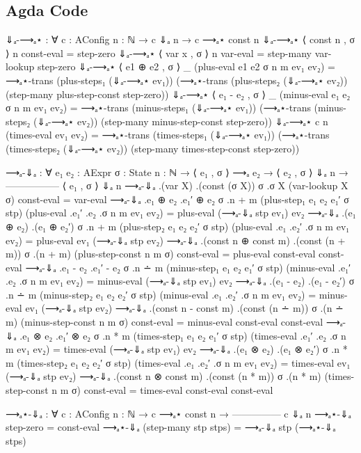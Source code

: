 \documentclass{lecturenotes}
\begin{document}
\subsection{Agda Code}

\begin{code}
⇓ₐ-⟶ₐ⋆ : ∀ {c : AConfig} {n : ℕ} → c ⇓ₐ n → c ⟶ₐ⋆ const n
⇓ₐ-⟶ₐ⋆ {⟨ const n , σ ⟩} {n} const-eval = step-zero
⇓ₐ-⟶ₐ⋆ {⟨ var x , σ ⟩} {n} var-eval = step-many var-lookup step-zero
⇓ₐ-⟶ₐ⋆ {⟨ e1 ⊕ e2 , σ ⟩} {_} (plus-eval {e1} {e2} {σ} {n} {m} ev₁ ev₂) =
  ⟶ₐ⋆-trans (plus-steps₁ (⇓ₐ-⟶ₐ⋆ ev₁))
 (⟶ₐ⋆-trans (plus-steps₂ (⇓ₐ-⟶ₐ⋆ ev₂))
            (step-many plus-step-const step-zero))
⇓ₐ-⟶ₐ⋆ {⟨ e₁ - e₂ , σ ⟩} {_} (minus-eval {e₁} {e₂} {σ} {n} {m} ev₁ ev₂) =
  ⟶ₐ⋆-trans (minus-steps₁ (⇓ₐ-⟶ₐ⋆ ev₁))
 (⟶ₐ⋆-trans (minus-steps₂ (⇓ₐ-⟶ₐ⋆ ev₂))
            (step-many minus-step-const step-zero))
⇓ₐ-⟶ₐ⋆ {c} {n} (times-eval ev₁ ev₂) = 
  ⟶ₐ⋆-trans (times-steps₁ (⇓ₐ-⟶ₐ⋆ ev₁))
 (⟶ₐ⋆-trans (times-steps₂ (⇓ₐ-⟶ₐ⋆ ev₂))
            (step-many times-step-const step-zero))

⟶ₐ-⇓ₐ : ∀ {e₁ e₂ : AExpr} {σ : State} {n : ℕ} →
   ⟨ e₁ , σ ⟩ ⟶ₐ e₂ →
   ⟨ e₂ , σ ⟩ ⇓ₐ n →
  -----------------
   ⟨ e₁ , σ ⟩ ⇓ₐ n
⟶ₐ-⇓ₐ {.(var X)} {.(const (σ X))} {σ} .{σ X} (var-lookup {X} {σ}) const-eval = var-eval
⟶ₐ-⇓ₐ .{e₁ ⊕ e₂} .{e₁′ ⊕ e₂} {σ} .{n + m} (plus-step₁ {e₁} {e₂} {e₁′} {σ} stp) (plus-eval .{e₁′} .{e₂} .{σ} {n} {m} ev₁ ev₂) = plus-eval (⟶ₐ-⇓ₐ stp ev₁) ev₂
⟶ₐ-⇓ₐ {.(e₁ ⊕ e₂)} {.(e₁ ⊕ e₂′)} {σ} .{n + m} (plus-step₂ {e₁} {e₂} {e₂′} {σ} stp) (plus-eval .{e₁} .{e₂′} .{σ} {n} {m} ev₁ ev₂) = plus-eval ev₁ (⟶ₐ-⇓ₐ stp ev₂)
⟶ₐ-⇓ₐ {.(const n ⊕ const m)} {.(const (n + m))} {σ} {.(n + m)} (plus-step-const {n} {m} {σ}) const-eval = plus-eval const-eval const-eval
⟶ₐ-⇓ₐ .{e₁ - e₂} .{e₁′ - e₂} {σ} .{n ∸ m} (minus-step₁ {e₁} {e₂} {e₁′} {σ} stp) (minus-eval .{e₁′} .{e₂} .{σ} {n} {m} ev₁ ev₂) = minus-eval (⟶ₐ-⇓ₐ stp ev₁) ev₂
⟶ₐ-⇓ₐ {.(e₁ - e₂)} {.(e₁ - e₂′)} {σ} .{n ∸ m} (minus-step₂ {e₁} {e₂} {e₂′} {σ} stp) (minus-eval .{e₁} .{e₂′} .{σ} {n} {m} ev₁ ev₂) = minus-eval ev₁ (⟶ₐ-⇓ₐ stp ev₂)
⟶ₐ-⇓ₐ {.(const n - const m)} {.(const (n ∸ m))} {σ} {.(n ∸ m)} (minus-step-const {n} {m} {σ}) const-eval = minus-eval const-eval const-eval
⟶ₐ-⇓ₐ .{e₁ ⊗ e₂} .{e₁′ ⊗ e₂} {σ} .{n * m} (times-step₁ {e₁} {e₂} {e₁′} {σ} stp) (times-eval .{e₁′} .{e₂} .{σ} {n} {m} ev₁ ev₂) = times-eval (⟶ₐ-⇓ₐ stp ev₁) ev₂
⟶ₐ-⇓ₐ {.(e₁ ⊗ e₂)} {.(e₁ ⊗ e₂′)} {σ} .{n * m} (times-step₂ {e₁} {e₂} {e₂′} {σ} stp) (times-eval .{e₁} .{e₂′} .{σ} {n} {m} ev₁ ev₂) = times-eval ev₁ (⟶ₐ-⇓ₐ stp ev₂)
⟶ₐ-⇓ₐ {.(const n ⊗ const m)} {.(const (n * m))} {σ} {.(n * m)} (times-step-const {n} {m} {σ}) const-eval = times-eval const-eval const-eval

⟶ₐ⋆-⇓ₐ : ∀ {c : AConfig} {n : ℕ} →
   c ⟶ₐ⋆ const n →
  ---------------
      c ⇓ₐ n
⟶ₐ⋆-⇓ₐ step-zero = const-eval
⟶ₐ⋆-⇓ₐ (step-many stp stps) = ⟶ₐ-⇓ₐ stp (⟶ₐ⋆-⇓ₐ stps)  
\end{code}
\end{document}
